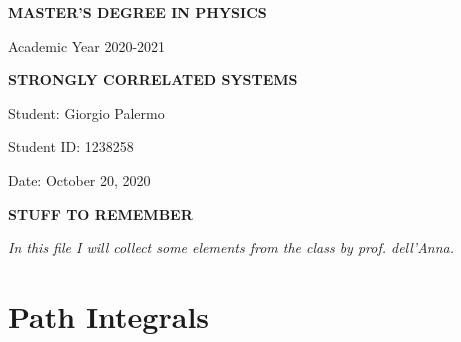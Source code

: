 \documentclass[a4paper]{article}
\newcommand{\thedate}{October 20, 2020}
\begin{document}
\hypersetup{linkcolor = black}
\hypersetup{linkcolor = blue}
\thispagestyle{plain}
\begin{center}
    \textbf{MASTER'S DEGREE IN PHYSICS}
    
    Academic Year 2020-2021
    
    \medskip
    \textbf{STRONGLY CORRELATED SYSTEMS}
\end{center}

\vspace{0.0cm}
Student: Giorgio Palermo

Student ID: 1238258

Date: \thedate
\begin{center}
\textbf{STUFF TO REMEMBER}
\medskip
\end{center}
\noindent
\textit{In this file I will collect some elements from the class by prof. dell'Anna.}

\section*{Path Integrals}
\end{document}

